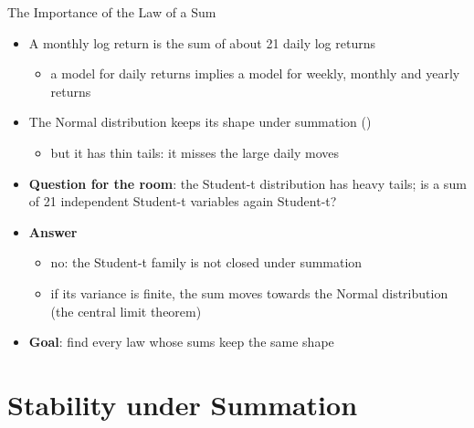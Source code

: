 \begin{frame}{The Importance of the Law of a Sum}
\itemsize{\small}
\begin{itemize}
    \item A monthly log return is the sum of about 21 daily log returns
    \begin{itemize}
        \item a model for daily returns implies a model for weekly, monthly and yearly returns
    \end{itemize}
    \item The Normal distribution keeps its shape under summation ()
    \begin{itemize}
        \item but it has thin tails: it misses the large daily moves
    \end{itemize}
    \item \textbf{Question for the room}: the Student-t distribution has heavy tails; is a sum of 21 independent Student-t variables again Student-t?
    \item \textbf{Answer}
    \begin{itemize}
        \item no: the Student-t family is not closed under summation
        \item if its variance is finite, the sum moves towards the Normal distribution (the central limit theorem)
    \end{itemize}
    \item \textbf{Goal}: find every law whose sums keep the same shape
\end{itemize}
\end{frame}


\section{Stability under Summation}

